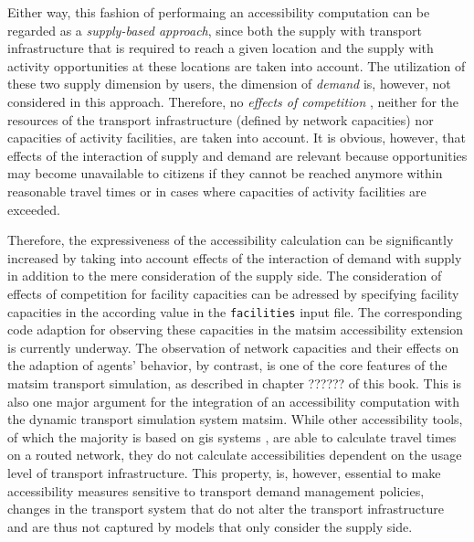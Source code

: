 Either way, this fashion of performaing an accessibility computation can be regarded as a \textit{supply-based approach}, 
since both the supply with transport infrastructure that is required to reach a given location and the supply with 
activity opportunities at these locations are taken into account. The utilization of these two supply dimension by users, 
\ie the dimension of \textit{demand} is, however, not considered in this approach. Therefore, no 
\textit{effects of competition} \citep{Geurs2004AccessibilityReview}, neither for the resources of the transport 
infrastructure (defined by network capacities) nor capacities of activity facilities, are taken into account. It is 
obvious, however, that effects of the interaction of supply and demand are relevant because opportunities may become 
unavailable to citizens if they cannot be reached anymore within reasonable travel times or in cases where capacities 
of activity facilities are exceeded. 

Therefore, the expressiveness of the accessibility calculation can be significantly increased by taking into account 
effects of the interaction of demand with supply in addition to the mere consideration of the supply side. The consideration
of effects of competition for facility capacities can be adressed by specifying facility capacities in the 
according value in the \lstinline{facilities} input file. The corresponding code adaption for observing these capacities 
in the \gls{matsim} accessibility extension is currently underway. The observation of network capacities and 
their effects on the adaption of agents' behavior, by contrast, is one of the core features of the \gls{matsim} transport 
simulation, as described in chapter ?????? of this book. 
This is also one major argument for the integration of an 
accessibility computation with the dynamic transport simulation system \gls{matsim}. While other accessibility tools, of 
which the majority is based on \gls{gis} systems
\citep{BBSR20xxErreichbarkeitsmodell, CurtisEtAl2013AccessibilityPolicyInnovation, BuettnerEtAl2010Erreichbarkeitsatlas, LiuZhu2004AccessibilityAnalyst, GulhanEtAl2014PotentialAccessibilityMeasureDenizli}
, are able to calculate travel times on a routed network, they 
do not calculate accessibilities dependent on the usage level of transport infrastructure. 
This property, is, however, essential to make accessibility measures sensitive to transport demand management policies, 
\ie changes in the transport system that do not alter the transport infrastructure and are thus not captured by models 
that only consider the supply side.

